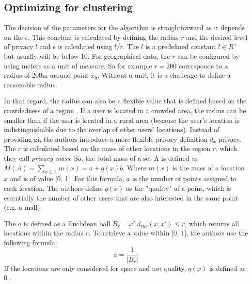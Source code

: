 \subsection{Optimizing for clustering} \label{2d:optimizing}
The decision of the parameters for the algorithm is straightforward as it depends on the $\epsilon$. \label{paragraph:choosing-r}
This constant is calculated by defining the radius $r$ and the desired level of privacy $l$ and $\epsilon$ is calculated using $l/r$.
The $l$ is a predefined constant $l \in R^+$ but usually will be below 10.
For geographical data, the $r$ can be configured by using meters as a unit of measure.
So for example $r = 200$ corresponds to a radius of 200m around point $x_0$.
Without a unit, it is a challenge to define a reasonable radius.

In that regard, the radius can also be a flexible value that is defined based on the crowdedness of a region \citep{chatzikokolakis_constructing_2015}.
If a user is located in a crowded area, the radius can be smaller than if the user is located in a rural area (because the user's location is indistinguishable due to the overlap of other users' locations).
Instead of providing \gls{gi}, the authors introduce a more flexible privacy definition $d_x$-privacy.
The $r$ is calculated based on the mass of other locations in the region $r$, which they call \emph{privacy mass}.
So, the total mass of a set A is defined as $M(A) = \sum_{x \in A} m(x) = a + q(x)b$.
Where $m(x)$ is the mass of a location $x$ and is of value [0, 1].
For this formula, $a$ is the number of points assigned to each location.
The authors define $q(x)$ as the "quality" of a point, which is essentially the number of other users that are also interested in the same point (e.g. a mall).

The $a$ is defined as a Euclidean ball $B_r = {x' | d_{euc}(x, x') \leq r}$, which returns all locations within the radius $r$.
To retrieve a value within [0, 1], the authors use the following formula:
\begin{equation}
  a = \frac{1}{|B_r|}
  \label{equation:privacy-mass-a}
\end{equation}
If the locations are only considered for space and not quality, $q(x)$ is defined as 0 \citep{chatzikokolakis_constructing_2015}. \newline


